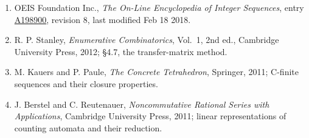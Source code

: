 \documentclass[11pt]{article}
\theoremstyle{definition}
\begin{document}
\begin{enumerate}

\item OEIS Foundation Inc., \emph{The On-Line Encyclopedia of Integer Sequences}, entry \href{https://oeis.org/A198900}{A198900}, revision 8, last modified Feb 18 2018.

\item R. P. Stanley, \emph{Enumerative Combinatorics}, Vol.~1, 2nd ed., Cambridge University Press, 2012; \S4.7, the transfer-matrix method.

\item M. Kauers and P. Paule, \emph{The Concrete Tetrahedron}, Springer, 2011; C-finite sequences and their closure properties.

\item J. Berstel and C. Reutenauer, \emph{Noncommutative Rational Series with Applications}, Cambridge University Press, 2011; linear representations of counting automata and their reduction.

\end{enumerate}
\end{document}
